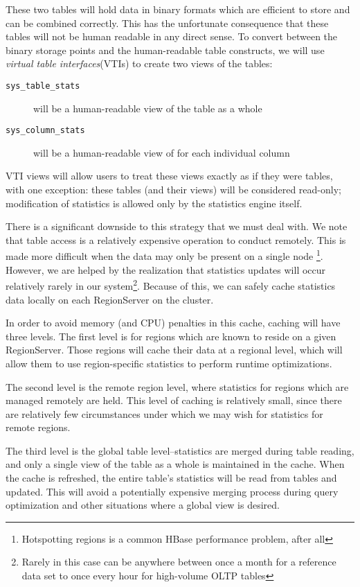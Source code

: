 These two tables will hold data in binary formats which are efficient to store and can be combined correctly. This has the unfortunate consequence that these tables will not be human readable in any direct sense. To convert between the binary storage points and the human-readable table constructs, we will use \emph{virtual table interfaces}(VTIs) to create two views of the tables:

\begin{description}
				\item[\texttt{sys\_table\_stats}] will be a human-readable view of the table as a whole
				\item[\texttt{sys\_column\_stats}] will be a human-readable view of for each individual column
\end{description}

VTI views will allow users to treat these views exactly as if they were tables, with one exception: these tables (and their views) will be considered read-only; modification of statistics is allowed only by the statistics engine itself.

There is a significant downside to this strategy that we must deal with. We note that table access is a relatively expensive operation to conduct remotely. This is made more difficult when the data may only be present on a single node \footnote{Hotspotting regions is a common HBase performance problem, after all}.  However, we are helped by the realization that statistics updates will occur relatively rarely in our system\footnote{Rarely in this case can be anywhere between once a month for a reference data set to once every hour for high-volume OLTP tables}. Because of this, we can safely cache statistics data locally on each RegionServer on the cluster.

In order to avoid memory (and CPU) penalties in this cache, caching will have three levels. The first level is for regions which are known to reside on a given RegionServer. Those regions will cache their data at a regional level, which will allow them to use region-specific statistics to perform runtime optimizations. 

The second level is the remote region level, where statistics for regions which are managed remotely are held. This level of caching is relatively small, since there are relatively few circumstances under which we may wish for statistics for remote regions.

The third level is the global table level--statistics are merged during table reading, and only a single view of the table as a whole is maintained in the cache. When the cache is refreshed, the entire table's statistics will be read from tables and updated. This will avoid a potentially expensive merging process during query optimization and other situations where a global view is desired.

